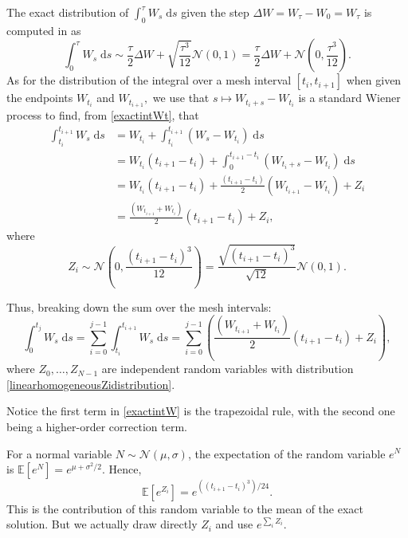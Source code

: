 \documentclass[reqno,12pt]{amsart}
\theoremstyle{plain} %
\theoremstyle{definition} %
\begin{document}
The exact distribution of $\int_0^\tau W_s\;\mathrm{d}s$ given the step $\Delta W = W_\tau - W_0 = W_\tau$ is computed in \cite[Section 14.2]{HanKloeden2017} as
\begin{equation}
    \label{exactintWt}
    \int_0^{\tau} W_s\;\mathrm{d}s \sim \frac{\tau}{2}\Delta W + \sqrt{\frac{\tau^3}{12}}\mathcal{N}(0, 1) = \frac{\tau}{2}\Delta W + \mathcal{N}\left(0, \frac{\tau^3}{12}\right).
\end{equation}
As for the distribution of the integral over a mesh interval $[t_i, t_{i+1}]$ when given the endpoints $W_{t_i}$ and $W_{t_{i+1}},$ we use that $s \mapsto W_{t_i+s} - W_{t_i}$ is a standard Wiener process to find, from \eqref{exactintWt}, that
\begin{align*}
    \int_{t_i}^{t_{i+1}} W_s\;\mathrm{d}s & = W_{t_i} + \int_{t_i}^{t_{i+1}} (W_s - W_{t_i})\;\mathrm{d}s \\
    & = W_{t_i}(t_{i+1} - t_i) + \int_{0}^{t_{i+1} - t_i} (W_{t_i+s} - W_{t_i})\;\mathrm{d}s \\
    & = W_{t_i}(t_{i+1} - t_i) + \frac{(t_{i+1} - t_i)}{2}(W_{t_{i+1}}-W_{t_{i}}) + Z_i \\
    & = \frac{(W_{t_{i+1}}+W_{t_{i}})}{2}(t_{i+1} - t_i) + Z_i,
\end{align*}
where
\begin{equation}
    \label{linearhomogeneousZidistribution}
    Z_i \sim \mathcal{N}\left(0, \frac{(t_{i+1}- t_i)^3}{12}\right) = \frac{\sqrt{(t_{i+1} - t_i)^3}}{\sqrt{12}}\mathcal{N}(0, 1).
\end{equation}

Thus, breaking down the sum over the mesh intervals:
\begin{equation}
    \label{exactintW}
    \int_0^{t_j} W_s\;\mathrm{d}s = \sum_{i = 0}^{j-1} \int_{t_i}^{t_{i+1}} W_s\;\mathrm{d}s = \sum_{i=0}^{j-1} \left( \frac{(W_{t_{i+1}}+W_{t_{i}})}{2}(t_{i+1} - t_i) + Z_i\right),
\end{equation}
where $Z_0, \ldots, Z_{N-1}$ are independent random variables with distribution \eqref{linearhomogeneousZidistribution}.

Notice the first term in \eqref{exactintW} is the trapezoidal rule, with the second one being a higher-order correction term.

For a normal variable $N \sim \mathcal{N}(\mu, \sigma)$, the expectation of the random variable $e^N$ is $\mathbb{E}[e^N] = e^{\mu + \sigma^2/2}$. Hence,
\begin{equation}
    \mathbb{E}[e^{Z_i}] = e^{((t_{i+1}- t_i)^3)/24}.
\end{equation}
This is the contribution of this random variable to the mean of the exact solution. But we actually draw directly $Z_i$ and use $e^{\sum_i Z_i}$.
\end{document}
